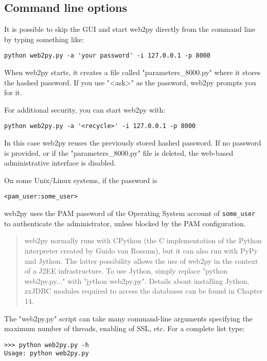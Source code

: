 \documentclass[justified,sixbynine,notoc]{tufte-book}
\def\ft{\small\tt}
\def\inxx#1{\index{#1}}
\begin{document}
\begin{fullwidth}
\goodbreak\section{Command line options}

It is possible to skip the GUI and start web2py directly from the command line by typing something like:
\inxx{password}

\begin{lstlisting}
python web2py.py -a 'your password' -i 127.0.0.1 -p 8000
\end{lstlisting}

When web2py starts, it creates a file called "parameters\_8000.py" where it stores the hashed password. If you use "<ask>" as the password, web2py prompts you for it.

For additional security, you can start web2py with:
\begin{lstlisting}
python web2py.py -a '<recycle>' -i 127.0.0.1 -p 8000
\end{lstlisting}

In this case web2py reuses the previously stored hashed password. If no password is provided, or if the "parameters\_8000.py" file is deleted, the web-based administrative interface is disabled.

\inxx{PAM}
On some Unix/Linux systems, if the password is
\begin{lstlisting}[keywords={}]
<pam_user:some_user>
\end{lstlisting}
\noindent web2py uses the PAM password of the Operating System account of {\ft some\_user} to authenticate the administrator, unless blocked by the PAM configuration.

\begin{quote}web2py normally runs with CPython (the C implementation of the Python interpreter created by Guido van Rossum), but it can also run with PyPy and Jython. The latter possibility allows the use of web2py in the context of a J2EE infrastructure. To use Jython, simply replace "python web2py.py..." with "jython web2py.py". Details about installing Jython, zxJDBC modules required to access the databases can be found in Chapter 14.\end{quote}
The "web2py.py" script can take many command-line arguments specifying the maximum number of threads, enabling of SSL, etc. For a complete list type:

\inxx{command line}
\begin{lstlisting}
>>> python web2py.py -h
Usage: python web2py.py


\end{lstlisting}
\end{fullwidth}
\end{document}

